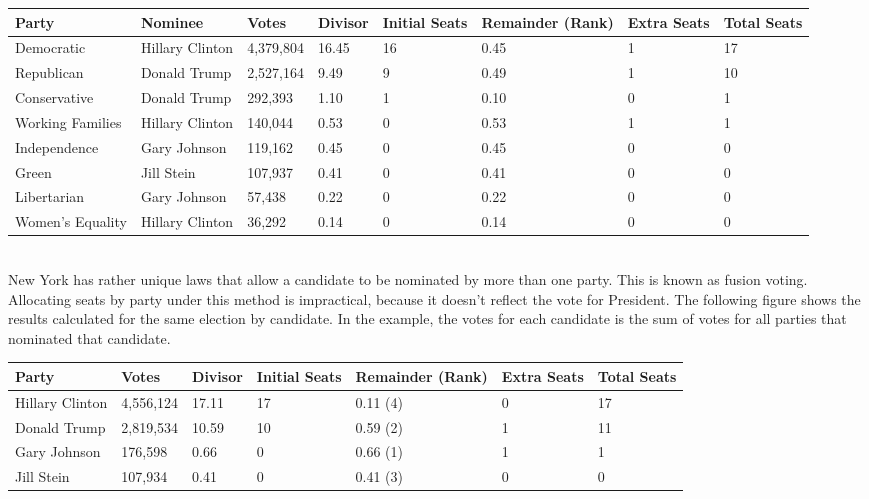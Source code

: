 \documentclass{article}
\begin{document}
    \begin{adjustbox}{center}
    \begin{tabular}{ |l|l|l|l|l|l|l|l| }
        \hline
        Party & Nominee & Votes & Divisor & Initial Seats & Remainder (Rank) & Extra Seats & Total Seats \\
        \hline
        Democratic & Hillary Clinton & 4,379,804 & 16.45 & 16 & 0.45 & 1 & 17 \\
        \hline
        Republican & Donald Trump & 2,527,164 & 9.49 & 9 & 0.49 & 1 & 10 \\
        \hline
        Conservative & Donald Trump & 292,393 & 1.10 & 1 & 0.10 & 0 & 1 \\
        \hline
        Working Families & Hillary Clinton & 140,044 & 0.53 & 0 & 0.53 & 1 & 1 \\
        \hline
        Independence & Gary Johnson & 119,162 & 0.45 & 0 & 0.45 & 0 & 0 \\
        \hline
        Green & Jill Stein & 107,937 & 0.41 & 0 & 0.41 & 0 & 0 \\
        \hline
        Libertarian & Gary Johnson & 57,438 & 0.22 & 0 & 0.22 & 0 & 0 \\
        \hline
        Women's Equality & Hillary Clinton & 36,292 & 0.14 & 0 & 0.14 & 0 & 0 \\
        \hline
    \end{tabular}
    \end{adjustbox} \\

    New York has rather unique laws that allow a candidate to be nominated by more than one party. This is known as fusion voting. Allocating seats by party under this method is impractical, because it doesn't reflect the vote for President. The following figure shows the results calculated for the same election by candidate. In the example, the votes for each candidate is the sum of votes for all parties that nominated that candidate.\\

    \begin{adjustbox}{center}
    \begin{tabular}{ |l|l|l|l|l|l|l| }
        \hline
        Party & Votes & Divisor & Initial Seats & Remainder (Rank) & Extra Seats & Total Seats \\
        \hline
        Hillary Clinton & 4,556,124 & 17.11 & 17 & 0.11 (4) & 0 & 17 \\
        \hline
        Donald Trump & 2,819,534 & 10.59 & 10 & 0.59 (2) & 1 & 11 \\
        \hline
        Gary Johnson & 176,598 & 0.66 & 0 & 0.66 (1) & 1 & 1 \\
        \hline
        Jill Stein & 107,934 & 0.41 & 0 & 0.41 (3) & 0 & 0 \\
        \hline
    \end{tabular}
    \end{adjustbox} \\
\end{document}
